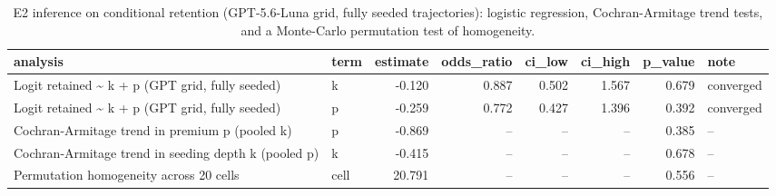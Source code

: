 \begin{table}[htbp]
\centering
\scriptsize
\caption{E2 inference on conditional retention (GPT-5.6-Luna grid, fully seeded trajectories): logistic regression, Cochran-Armitage trend tests, and a Monte-Carlo permutation test of homogeneity.}
\label{tab:tab11_e2_inference}
\begin{tabular}{llrrrrrl}
\toprule
analysis & term & estimate & odds\_ratio & ci\_low & ci\_high & p\_value & note \\
\midrule
Logit retained \textasciitilde{} k + p (GPT grid, fully seeded) & k & -0.120 & 0.887 & 0.502 & 1.567 & 0.679 & converged \\
Logit retained \textasciitilde{} k + p (GPT grid, fully seeded) & p & -0.259 & 0.772 & 0.427 & 1.396 & 0.392 & converged \\
Cochran-Armitage trend in premium p (pooled k) & p & -0.869 & -- & -- & -- & 0.385 & -- \\
Cochran-Armitage trend in seeding depth k (pooled p) & k & -0.415 & -- & -- & -- & 0.678 & -- \\
Permutation homogeneity across 20 cells & cell & 20.791 & -- & -- & -- & 0.556 & -- \\
\bottomrule
\end{tabular}
\end{table}